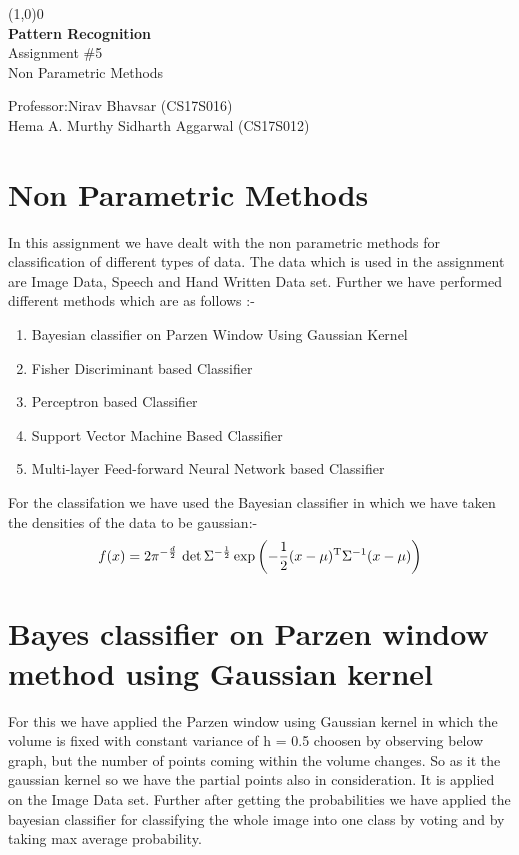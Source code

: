 \documentclass[12pt]{report}
\begin{document}
\begin{titlepage}
  \begin{center}
    \line(1,0){0}\\
    [4cm]
    \huge{\bfseries Pattern Recognition}\\
    [0.5cm]
    Assignment \#5\\
    [0.5cm]
    \LARGE{Non Parametric Methods} \\
    [10cm]
    \end{center}
    \begin{center}
      \large{Professor:\hfill Nirav Bhavsar (CS17S016)\\
      Hema A. Murthy \hfill Sidharth Aggarwal (CS17S012)\\
       }
  \end{center}
\end{titlepage}
\setcounter{chapter}{1}
\section {Non Parametric Methods}
In this assignment we have dealt with the non parametric methods for classification of different types of data. The data which is used in the assignment are Image Data, Speech and Hand Written Data set. Further we have performed different methods which are as follows :-
\begin{enumerate}
 \item Bayesian classifier on Parzen Window Using Gaussian Kernel
 \item Fisher Discriminant based Classifier
\item Perceptron based Classifier
 \item Support Vector Machine Based Classifier
\item Multi-layer Feed-forward Neural Network based Classifier
\end{enumerate}
For the classifation we have used the Bayesian classifier in which we have taken the densities of the data to be gaussian:-
\begin{displaymath}
{\displaystyle f(x)={2\pi } ^{-{\frac{d}{2}}}\,\det{\Sigma}^{-{\frac {1}{2}}}
\exp \left(-{1 \over 2}(x-\mu )^{\mathrm {T} }{\Sigma} ^{-1}(x-\mu )\right)}
\end{displaymath}

\section {Bayes classifier on Parzen window method using Gaussian kernel}
For this we have applied the Parzen window using Gaussian kernel in which the volume is fixed with constant variance of h = 0.5 choosen by observing below graph, but the number of points coming within the volume changes. So as it the gaussian kernel so we have the partial points also in consideration. It is applied on the Image Data set. Further after getting the probabilities we have applied the bayesian classifier for classifying the whole image into one class by voting and by taking max average probability.
\end{document}
